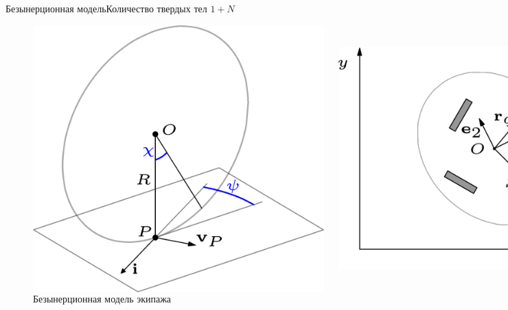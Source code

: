 \begin{frame}{Безынерционная модель}{Количество твердых тел $1 + N$}
    \begin{figure}[H]
        \centering
        \begin{columns}
                \centering
                \includegraphics[width=\textwidth]{content/pic/asy/wheel_bor.png}
                \caption{Безынерционная модель колеса}
                \label{fig:bor_wheel_scheme}
                \centering
                \includegraphics[width=\textwidth]{content/pic/asy/cart_bor.png}
                \caption{Безынерционная модель экипажа}
                \label{fig:bor_vehicle}
        \end{columns}
    \end{figure}
\end{frame}